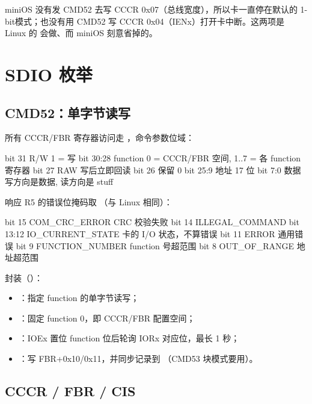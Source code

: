 miniOS 没有发 CMD52 去写 CCCR 0x07（总线宽度），所以卡一直停在默认的 1-bit模式；也没有用 CMD52 写 CCCR 0x04（IENx）打开卡中断。这两项是 Linux 的 会做、而 miniOS 刻意省掉的。

\section{SDIO 枚举}

\subsection{CMD52：单字节读写}

所有 CCCR/FBR 寄存器访问走 ，命令参数位域：

\begin{txtcode}
bit 31     R/W        1 = 写
bit 30:28  function   0 = CCCR/FBR 空间, 1..7 = 各 function 寄存器
bit 27     RAW        写后立即回读
bit 26     保留 0
bit 25:9   地址       17 位
bit  7:0   数据       写方向是数据, 读方向是 stuff
\end{txtcode}

响应 R5 的错误位掩码取 （与 Linux  相同）：

\begin{txtcode}
bit 15     COM_CRC_ERROR     CRC 校验失败
bit 14     ILLEGAL_COMMAND
bit 13:12  IO_CURRENT_STATE  卡的 I/O 状态，不算错误
bit 11     ERROR             通用错误
bit  9     FUNCTION_NUMBER   function 号超范围
bit  8     OUT_OF_RANGE      地址超范围
\end{txtcode}

封装（）：

\begin{itemize}
  \item {}：指定 function 的单字节读写；
  \item {}：固定 function 0，即 CCCR/FBR 配置空间；
  \item {}：IOEx 置位 function 位后轮询 IORx 对应位，最长 1 秒；
  \item {}：写 FBR+0x10/0x11，并同步记录到 （CMD53 块模式要用）。
\end{itemize}

\subsection{CCCR / FBR / CIS}

